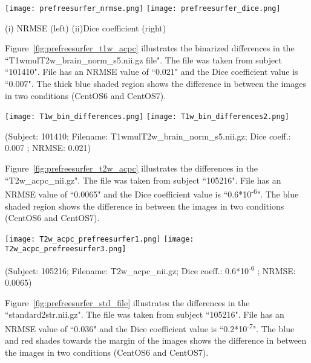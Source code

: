 \hfill \break
\begin{center}
\texttt{[image: prefreesurfer\_nrmse.png]}%
\texttt{[image: prefreesurfer\_dice.png]}
\caption*{(i) NRMSE (left) (ii)Dice coefficient (right)}
\label{fig:prefreesurfer_metric_values}
\end{center}
\hfill \break

Figure~\ref{fig:prefreesurfer_t1w_acpc} illustrates the binarized differences in the ``T1wmulT2w\_brain\_norm\_s5.nii.gz file". The file was taken from subject ``101410". File has an NRMSE value of ``0.021" and the Dice coefficient value is ``0.007". The thick blue shaded region shows the difference in between the images in two conditions (CentOS6 and CentOS7).

\hfill \break
\begin{center}
\texttt{[image: T1w\_bin\_differences.png]}%
\texttt{[image: T1w\_bin\_differences2.png]}
\caption*{(Subject: 101410; Filename: T1wmulT2w\_brain\_norm\_s5.nii.gz; Dice coeff.: 0.007 ; NRMSE: 0.021)}
\label{fig:prefreesurfer_t1w_acpc}
\end{center}
\hfill \break

Figure~\ref{fig:prefreesurfer_t2w_acpc} illustrates the differences in the ``T2w\_acpc\_nii.gz". The file was taken from subject ``105216". File has an NRMSE value of ``0.0065" and the Dice coefficient value is ``0.6*10\textsuperscript{-6}". The blue shaded region shows the difference in between the images in two conditions (CentOS6 and CentOS7).

\hfill \break
\begin{center}
\texttt{[image: T2w\_acpc\_prefreesurfer1.png]}%
\texttt{[image: T2w\_acpc\_prefreesurfer3.png]}
\caption*{(Subject: 105216; Filename: T2w\_acpc\_nii.gz; Dice coeff.: 0.6*10\textsuperscript{-6} ; NRMSE: 0.0065)}
\label{fig:prefreesurfer_t2w_acpc}
\end{center}
\hfill \break

Figure~\ref{fig:prefreesurfer_std_file} illustrates the differences in the ``standard2str.nii.gz". The file was taken from subject ``105216". File has an NRMSE value of ``0.036" and the Dice coefficient value is ``0.2*10\textsuperscript{-7}". The blue and red shades towards the margin of the images shows the difference in between the images in two conditions (CentOS6 and CentOS7).

